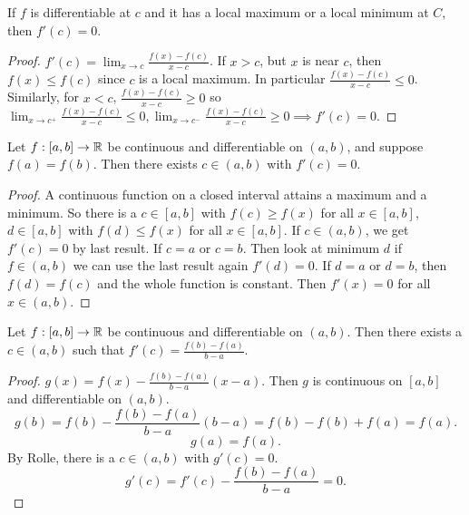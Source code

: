 \begin{proposition}\label{prop:diff_max_or_min}
    If $f$ is differentiable at $c$ and it has a local maximum or a local minimum at $C$,
    then $f'(c) = 0$.
\end{proposition}
\begin{proof}
    $f'(c) = \lim_{x \to c}\frac{f(x) - f(c)}{x - c}$.
    If $x > c$,
    but $x$ is near $c$,
    then $f(x) \leq f(c)$ since $c$ is a local maximum.
    In particular $\frac{f(x) - f(c)}{x - c} \leq 0$.
    Similarly,
    for $x < c$,
    $\frac{f(x) - f(c)}{x - c} \geq 0$ so $\lim_{x \to c ^ {+}}\frac{f(x) - f(c)}{x - c} \leq 0, \lim_{x \to c ^ {-}}\frac{f(x) - f(c)}{x - c} \geq 0 \implies f'(c) = 0$.
\end{proof}

\begin{theorem}\label{thm:rolles}
    Let $f : [a, b] \to \mathbb{R}$ be continuous and differentiable on $(a, b)$,
    and suppose $f(a) = f(b)$.
    Then there exists $c \in (a, b)$ with $f'(c) = 0$.
\end{theorem}
\begin{proof}
    A continuous function on a closed interval attains a maximum and a minimum.
    So there is a $c \in [a, b]$ with $f(c) \geq f(x)$ for all $x \in [a, b]$,
    $d \in [a, b]$ with $f(d) \leq f(x)$ for all $x \in [a, b]$.
    If $c \in (a, b)$,
    we get $f'(c) = 0$ by last result.
    If $c = a$ or $c = b$.
    Then look at minimum $d$ if $f \in (a, b)$ we can use the last result again $f'(d) = 0$.
    If $d = a$ or $d = b$,
    then $f(d) = f(c)$ and the whole function is constant.
    Then $f'(x) = 0$ for all $x \in (a, b)$.
\end{proof}

\begin{theorem}\label{thm:mean_value_thm}
    Let $f : [a, b] \to \mathbb{R}$ be continuous and differentiable on $(a, b)$.
    Then there exists a $c \in (a, b)$ such that $f'(c) = \frac{f(b) - f(a)}{b - a}$.
\end{theorem}
\begin{proof}
    $g(x) = f(x) - \frac{f(b) - f(a)}{b - a}(x - a)$.
    Then $g$ is continuous on $[a, b]$ and differentiable on $(a, b)$.
    \[
    g(b) = f(b) - \frac{f(b) - f(a)}{b - a}(b - a) = f(b) - f(b) + f(a) = f(a).
    \]
    \[
    g(a) = f(a).
    \]
    By Rolle,
    there is a $c \in (a, b)$ with $g'(c) = 0$.
    \[
    g'(c) = f'(c) - \frac{f(b) - f(a)}{b - a} = 0.
    \]
\end{proof}

